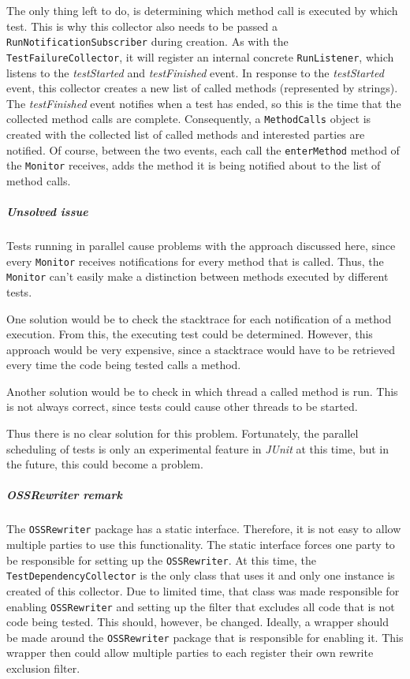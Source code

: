 \documentclass[i2]{oss}
\newcommand{\class}[1]{\texttt{#1}}
\newcommand{\method}[1]{\texttt{#1}}
\newcommand{\junit}{\emph{JUnit }}
\begin{document}
The only thing left to do, is determining which method call is executed by which test.
This is why this collector also needs to be passed a \class{RunNotificationSubscriber} during creation.
As with the \class{TestFailureCollector}, it will register an internal concrete \class{RunListener}, which listens to the \emph{testStarted} and \emph{testFinished} event.
In response to the \emph{testStarted} event, this collector creates a new list of called methods (represented by strings).
The \emph{testFinished} event notifies when a test has ended, so this is the time that the collected method calls are complete. Consequently, a \class{MethodCalls} object is created with the collected list of called methods and interested parties are notified.
Of course, between the two events, each call the \method{enterMethod} method of the \class{Monitor} receives, adds the method it is being notified about to the list of method calls.


\subparagraph{Unsolved issue}

Tests running in parallel cause problems with the approach discussed here, since every \class{Monitor} receives notifications for every method that is called.
Thus, the \class{Monitor} can't easily make a distinction between methods executed by different tests.

One solution would be to check the stacktrace for each notification of a method execution. 
From this, the executing test could be determined.
However, this approach would be very expensive, 
since a stacktrace would have to be retrieved every time the code being tested calls a method.

Another solution would be to check in which thread a called method is run.
This is not always correct, since tests could cause other threads to be started.

Thus there is no clear solution for this problem.
Fortunately, the parallel scheduling of tests is only an experimental feature in \junit at this time, but in the future, this could become a problem.


\subparagraph{OSSRewriter remark}

The \class{OSSRewriter} package has a static interface.
Therefore, it is not easy to allow multiple parties to use this functionality.
The static interface forces one party to be responsible for setting up the \class{OSSRewriter}.
At this time, the \class{TestDependencyCollector} is the only class that uses it and only one instance is created of this collector.
Due to limited time, that class was made responsible for enabling \class{OSSRewriter} and setting up the filter that excludes all code that is not code being tested.
This should, however, be changed.
Ideally, a wrapper should be made around the \class{OSSRewriter} package that is responsible for enabling it.
This wrapper then could allow multiple parties to each register their own rewrite exclusion filter.
\end{document}
